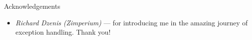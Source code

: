 \begin{frame}{Acknowledgements}
  \begin{center}
    \begin{itemize}
    \item \textit{Richard Dzenis (Zimperium)} --- for introducing me in the amazing journey of exception handling.  Thank you!
      
    \end{itemize}
  \end{center}
\end{frame}
